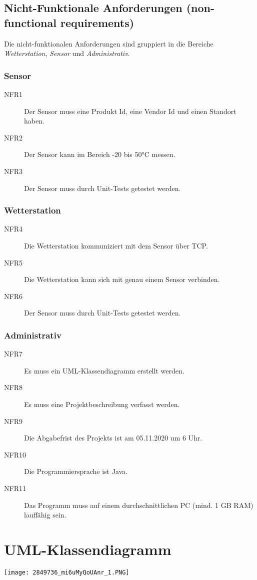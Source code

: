 \documentclass[a4paper]{report}
\begin{document}
\section{Nicht-Funktionale Anforderungen (non-functional requirements)}
Die nicht-funktionalen Anforderungen sind gruppiert in die Bereiche \textit{Wetterstation}, \textit{Sensor} und \textit{Administrativ}.
\subsection{Sensor}
\begin{description}
    \item[NFR1] Der Sensor muss eine Produkt Id, eine Vendor Id und einen Standort haben.
    \item[NFR2] Der Sensor kann im Bereich -20 bis 50°C  messen.
    \item[NFR3] Der Sensor muss durch Unit-Tests getestet werden.
\end{description}

\subsection{Wetterstation}
\begin{description}
    \item[NFR4] Die Wetterstation kommuniziert mit dem Sensor über TCP.
    \item[NFR5] Die Wetterstation kann sich mit genau einem Sensor verbinden.
    \item[NFR6] Der Sensor muss durch Unit-Tests getestet werden.
\end{description}

\subsection{Administrativ}
\begin{description}
    \item[NFR7] Es muss ein UML-Klassendiagramm erstellt werden.
    \item[NFR8] Es muss eine Projektbeschreibung verfasst werden.
    \item[NFR9] Die Abgabefrist des Projekts ist am 05.11.2020 um 6 Uhr.
    \item[NFR10] Die Programmiersprache ist Java.
    \item[NFR11] Das Programm muss auf einem durchschnittlichen PC (mind. 1 GB RAM) lauffähig sein. 
\end{description}

\chapter{UML-Klassendiagramm}
\texttt{[image: 2849736\_mi6uMyQoUAnr\_1.PNG]}
\end{document}
